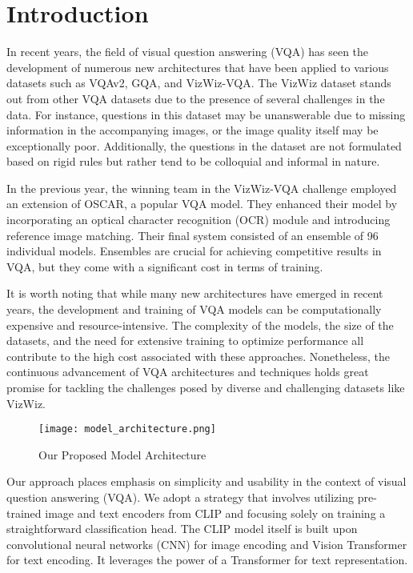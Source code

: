 \documentclass[final,5p,times,twocolumn,authoryear]{elsarticle}
\begin{document}
\section{Introduction}
\label{introduction}

In recent years, the field of visual question answering (VQA) has seen the development of numerous new architectures that have been applied to various datasets such as VQAv2, GQA, and VizWiz-VQA. The VizWiz dataset stands out from other VQA datasets due to the presence of several challenges in the data. For instance, questions in this dataset may be unanswerable due to missing information in the accompanying images, or the image quality itself may be exceptionally poor. Additionally, the questions in the dataset are not formulated based on rigid rules but rather tend to be colloquial and informal in nature.

In the previous year, the winning team in the VizWiz-VQA challenge employed an extension of OSCAR, a popular VQA model. They enhanced their model by incorporating an optical character recognition (OCR) module and introducing reference image matching. Their final system consisted of an ensemble of 96 individual models. Ensembles are crucial for achieving competitive results in VQA, but they come with a significant cost in terms of training.

It is worth noting that while many new architectures have emerged in recent years, the development and training of VQA models can be computationally expensive and resource-intensive. The complexity of the models, the size of the datasets, and the need for extensive training to optimize performance all contribute to the high cost associated with these approaches. Nonetheless, the continuous advancement of VQA architectures and techniques holds great promise for tackling the challenges posed by diverse and challenging datasets like VizWiz.

\begin{figure}
	\centering 
	\texttt{[image: model\_architecture.png]}	
	\caption{Our Proposed Model Architecture} 
	\label{fig_mom0}%
\end{figure}

Our approach places emphasis on simplicity and usability in the context of visual question answering (VQA). We adopt a strategy that involves utilizing pre-trained image and text encoders from CLIP and focusing solely on training a straightforward classification head. The CLIP model itself is built upon convolutional neural networks (CNN) for image encoding and Vision Transformer for text encoding. It leverages the power of a Transformer for text representation.
\end{document}
